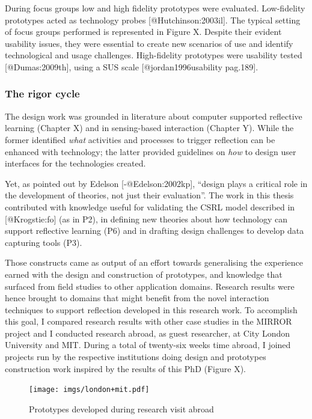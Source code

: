 During focus groups low and high fidelity prototypes were evaluated.
Low-fidelity prototypes acted as technology probes
{[}@Hutchinson:2003il{]}. The typical setting of focus groups performed
is represented in Figure X. Despite their evident usability issues, they
were essential to create new scenarios of use and identify technological
and usage challenges. High-fidelity prototypes were usability tested
{[}@Dumas:2009th{]}, using a SUS scale {[}@jordan1996usability
pag.189{]}.

\subsubsection{The rigor cycle}\label{the-rigor-cycle}

The design work was grounded in literature about computer supported
reflective learning (Chapter X) and in sensing-based interaction
(Chapter Y). While the former identified \emph{what} activities and
processes to trigger reflection can be enhanced with technology; the
latter provided guidelines on \emph{how} to design user interfaces for
the technologies created.

Yet, as pointed out by Edelson {[}-@Edelson:2002kp{]}, ``design plays a
critical role in the development of theories, not just their
evaluation''. The work in this thesis contributed with knowledge useful
for validating the CSRL model described in {[}@Krogstie:fo{]} (as in
P2), in defining new theories about how technology can support
reflective learning (P6) and in drafting design challenges to develop
data capturing tools (P3).

Those constructs came as output of an effort towards generalising the
experience earned with the design and construction of prototypes, and
knowledge that surfaced from field studies to other application domains.
Research results were hence brought to domains that might benefit from
the novel interaction techniques to support reflection developed in this
research work. To accomplish this goal, I compared research results with
other case studies in the MIRROR project and I conducted research
abroad, as guest researcher, at City London University and MIT. During a
total of twenty-six weeks time abroad, I joined projects run by the
respective institutions doing design and prototypes construction work
inspired by the results of this PhD (Figure X).

\begin{figure}[htbp]
\centering
\texttt{[image: imgs/london+mit.pdf]}
\caption{Prototypes developed during research visit abroad}
\end{figure}

